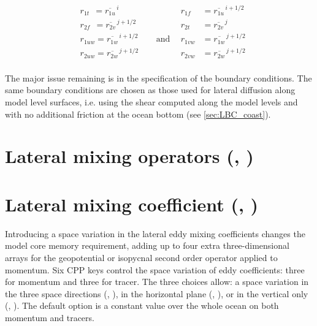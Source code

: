\documentclass[../tex_main/NEMO_manual]{subfiles}
\begin{document}
\begin{equation} \label{eq:ldfslp_dyn}
\begin{aligned}
&r_{1t}\ \ = \overline{r_{1u}}^{\,i}       &&&    r_{1f}\ \ &= \overline{r_{1u}}^{\,i+1/2} \\
&r_{2f} \ \ = \overline{r_{2v}}^{\,j+1/2} &&& 	r_{2t}\ &= \overline{r_{2v}}^{\,j} \\
&r_{1uw}  = \overline{r_{1w}}^{\,i+1/2} &&\ \ \text{and} \ \ &   r_{1vw}&= \overline{r_{1w}}^{\,j+1/2} \\
&r_{2uw}= \overline{r_{2w}}^{\,j+1/2} &&&         r_{2vw}&= \overline{r_{2w}}^{\,j+1/2}\\
\end{aligned}
\end{equation}

The major issue remaining is in the specification of the boundary conditions. 
The same boundary conditions are chosen as those used for lateral 
diffusion along model level surfaces, i.e. using the shear computed along 
the model levels and with no additional friction at the ocean bottom (see 
\autoref{sec:LBC_coast}).


\section{Lateral mixing operators (\protect{}, \protect{}) }
\label{sec:LDF_op}


   
\section{Lateral mixing coefficient (\protect{}, \protect{}) }
\label{sec:LDF_coef}

Introducing a space variation in the lateral eddy mixing coefficients changes 
the model core memory requirement, adding up to four extra three-dimensional 
arrays for the geopotential or isopycnal second order operator applied to 
momentum. Six CPP keys control the space variation of eddy coefficients: 
three for momentum and three for tracer. The three choices allow: 
a space variation in the three space directions (,  ), 
in the horizontal plane (,  ), 
or in the vertical only (,  ). 
The default option is a constant value over the whole ocean on both momentum and tracers. 
   
\end{document}

